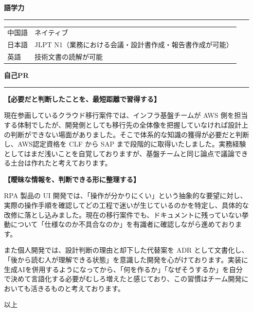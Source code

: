 \documentclass[paper=a4paper,fontsize=10pt,head_space=18mm,foot_space=15mm,gutter=15mm,fore_edge=15mm,baselineskip=16pt]{jlreq}
\newcommand{\kyariku}[1]{%
  \par\vspace{10pt}%
  {\Large\bfseries #1}\par\vspace{4pt}%
  {\color{gray}\rule{\textwidth}{0.4pt}}\par\vspace{6pt}%
}
\begin{document}
\kyariku{語学力}

\begin{tabular}{@{}p{6em}p{\dimexpr\textwidth-6em\relax}@{}}
  中国語 & ネイティブ \\
  日本語 & JLPT N1（業務における会議・設計書作成・報告書作成が可能） \\
  英語 & 技術文書の読解が可能 \\
\end{tabular}

\kyariku{自己PR}

\textbf{【必要だと判断したことを、最短距離で習得する】}\par
現在参画しているクラウド移行案件では、インフラ基盤チームが AWS 側を担当する体制でしたが、開発側としても移行先の全体像を把握していなければ設計上の判断ができない場面がありました。そこで体系的な知識の獲得が必要だと判断し、AWS認定資格を CLF から SAP まで段階的に取得いたしました。実務経験としてはまだ浅いことを自覚しておりますが、基盤チームと同じ論点で議論できる土台は作れたと考えております。

\textbf{【曖昧な情報を、判断できる形に整理する】}\par
RPA 製品の UI 開発では、「操作が分かりにくい」という抽象的な要望に対し、実際の操作手順を確認してどの工程で迷いが生じているのかを特定し、具体的な改修に落とし込みました。現在の移行案件でも、ドキュメントに残っていない挙動について「仕様なのか不具合なのか」を有識者に確認しながら進めております。

また個人開発では、設計判断の理由と却下した代替案を ADR として文書化し、「後から読む人が理解できる状態」を意識した開発を心がけております。実装に生成AIを併用するようになってから、「何を作るか」「なぜそうするか」を自分で決めて言語化する必要がむしろ増えたと感じており、この習慣はチーム開発においても活きるものと考えております。

\vspace{8pt}
\begin{flushright}
以上
\end{flushright}
\end{document}
